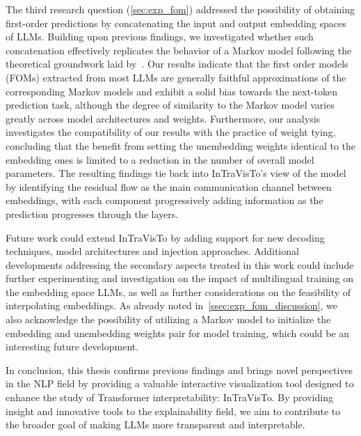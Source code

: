The third research question (\cref{sec:exp_fom}) addressed the possibility of obtaining first-order predictions by concatenating the input and output embedding spaces of LLMs.
Building upon previous findings, we investigated whether such concatenation effectively replicates the behavior of a Markov model following the theoretical groundwork laid by~\citet{elhage2021}.
Our results indicate that the first order models (FOMs) extracted from most LLMs are generally faithful approximations of the corresponding Markov models and exhibit a solid bias towards the next-token prediction task, although the degree of similarity to the Markov model varies greatly across model architectures and weights.
Furthermore, our analysis investigates the compatibility of our results with the practice of weight tying, concluding that the benefit from setting the unembedding weights identical to the embedding ones is limited to a reduction in the number of overall model parameters.
The resulting findings tie back into InTraVisTo's view of the model by identifying the residual flow as the main communication channel between embeddings, with each component progressively adding information as the prediction progresses through the layers.

Future work could extend InTraVisTo by adding support for new decoding techniques, model architectures and injection approaches.
Additional developments addressing the secondary aspects treated in this work could include further experimenting and investigation on the impact of multilingual training on the embedding space LLMs, as well as further considerations on the feasibility of interpolating embeddings.
As already noted in~\cref{ssec:exp_fom_discussion}, we also acknowledge the possibility of utilizing a Markov model to initialize the embedding and unembedding weights pair for model training, which could be an interesting future development.

In conclusion, this thesis confirms previous findings and brings novel perspectives in the NLP field by providing a valuable interactive visualization tool designed to enhance the study of Transformer interpretability: InTraVisTo.
By providing insight and innovative tools to the explainability field, we aim to contribute to the broader goal of making LLMs more transparent and interpretable.
